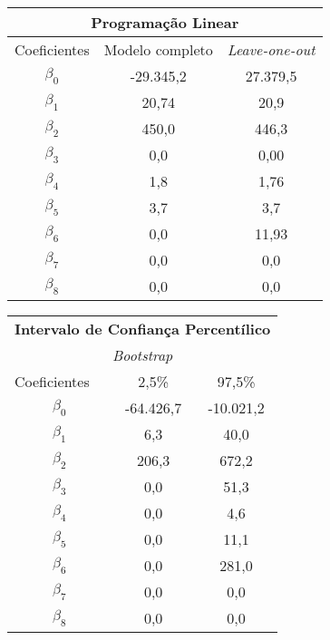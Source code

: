 \documentclass{article}
\begin{document}
\begin{table}[]
	\centering
	\begin{tabular}{ccc}
		\hline
		\multicolumn{3}{c}{\textbf{Programação Linear}}                             \\ \hline
		\multicolumn{1}{l}{Coeficientes} & Modelo completo & \textit{Leave-one-out} \\ \hline
		$\beta_0$                        & -29.345,2       & 27.379,5               \\
		$\beta_1$                        & 20,74           & 20,9                   \\
		$\beta_2$                        & 450,0           & 446,3                  \\
		$\beta_3$                        & 0,0             & 0,00                   \\
		$\beta_4$                        & 1,8             & 1,76                   \\
		$\beta_5$                        & 3,7             & 3,7                    \\
		$\beta_6$                        & 0,0             & 11,93                  \\
		$\beta_7$                        & 0,0             & 0,0                    \\
		$\beta_8$                        & 0,0             & 0,0                    \\ \hline
	\end{tabular}
\end{table}


\begin{table}[]
	\centering
	\begin{tabular}{ccc}
		\hline
		\multicolumn{3}{c}{\textbf{Intervalo de Confiança Percentílico}} \\ 
		\multicolumn{3}{c}{\textit{Bootstrap}}                           \\ \hline \hline
		\multicolumn{1}{l}{Coeficientes}    & 2,5\%        & 97,5\%      \\ \hline
		$\beta_0$                           & -64.426,7    & -10.021,2   \\
		$\beta_1$                           & 6,3          & 40,0        \\
		$\beta_2$                           & 206,3        & 672,2       \\
		$\beta_3$                           & 0,0          & 51,3        \\
		$\beta_4$                           & 0,0          & 4,6         \\
		$\beta_5$                           & 0,0          & 11,1        \\
		$\beta_6$                           & 0,0          & 281,0       \\
		$\beta_7$                           & 0,0          & 0,0         \\
		$\beta_8$                           & 0,0          & 0,0         \\ \hline
	\end{tabular}
\end{table}
\end{document}
